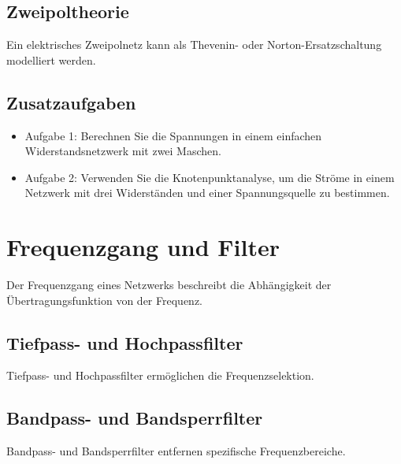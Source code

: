 \documentclass[11pt,a4paper]{article}
\begin{document}




\subsection{Zweipoltheorie}
Ein elektrisches Zweipolnetz kann als Thevenin- oder Norton-Ersatzschaltung modelliert werden.



\subsection{Zusatzaufgaben}
\begin{itemize}
	\item Aufgabe 1: Berechnen Sie die Spannungen in einem einfachen Widerstandsnetzwerk mit zwei Maschen.
	\item Aufgabe 2: Verwenden Sie die Knotenpunktanalyse, um die Ströme in einem Netzwerk mit drei Widerständen und einer Spannungsquelle zu bestimmen.
\end{itemize}


\vspace{1cm}
\section{Frequenzgang und Filter}
Der Frequenzgang eines Netzwerks beschreibt die Abhängigkeit der Übertragungsfunktion von der Frequenz.


\subsection{Tiefpass- und Hochpassfilter}
Tiefpass- und Hochpassfilter ermöglichen die Frequenzselektion.

\subsection{Bandpass- und Bandsperrfilter}
Bandpass- und Bandsperrfilter entfernen spezifische Frequenzbereiche.
\end{document}
